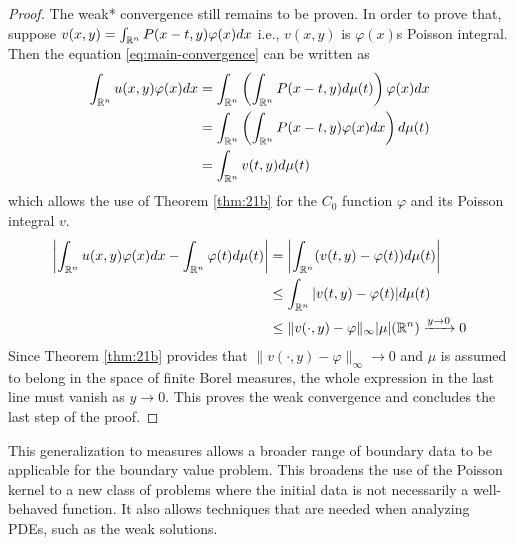 \begin{proof}
    The weak* convergence still remains to be proven. In order to prove that, suppose $v(x,y)=\int_{\mathbb R^n}P(x-t,y)\varphi(x)dx$ i.e., $v(x,y)$ is $\varphi(x)$s Poisson integral. Then the equation \ref{eq:main-convergence} can be written as
    \begin{align*}
        \int_{\mathbb R^n}u(x,y)\varphi(x)dx&=\int_{\mathbb R^n}\left(\int_{\mathbb R^n}P(x-t,y)d\mu(t)\right)\varphi(x)dx \\
        &=\int_{\mathbb R^n}\left(\int_{\mathbb R^n}P(x-t,y)\varphi(x)dx\right)d\mu(t) \\
        &=\int_{\mathbb R^n}v(t,y)d\mu(t)
    \end{align*}
    which allows the use of Theorem \ref{thm:21b} for the $C_0$ function $\varphi$ and its Poisson integral $v$.
    \begin{align*}
        \left|\int_{\mathbb R^n}u(x,y)\varphi(x)dx-\int_{\mathbb R^n}\varphi(t)d\mu(t)\right|&=\left|\int_{\mathbb R^n}(v(t,y)-\varphi(t))d\mu(t)\right| \\
        &\leq\int_{\mathbb R^n}|v(t,y)-\varphi(t)|d\mu(t) \\
        &\leq\|v(\cdot,y)-\varphi\|_\infty|\mu|(\mathbb R^n)\xrightarrow{y\rightarrow0}0
    \end{align*}
    Since Theorem \ref{thm:21b} provides that $\|v(\cdot,y)-\varphi\|_\infty\rightarrow0$ and $\mu$ is assumed to belong in the space of finite Borel measures, the whole expression in the last line must vanish as $y\rightarrow0$. This proves the weak convergence and concludes the last step of the proof. 
\end{proof}

This generalization to measures allows a broader range of boundary data to be applicable for the boundary value problem. This broadens the use of the Poisson kernel to a new class of problems where the initial data is not necessarily a well-behaved function. It also allows techniques that are needed when analyzing PDEs, such as the weak solutions. 